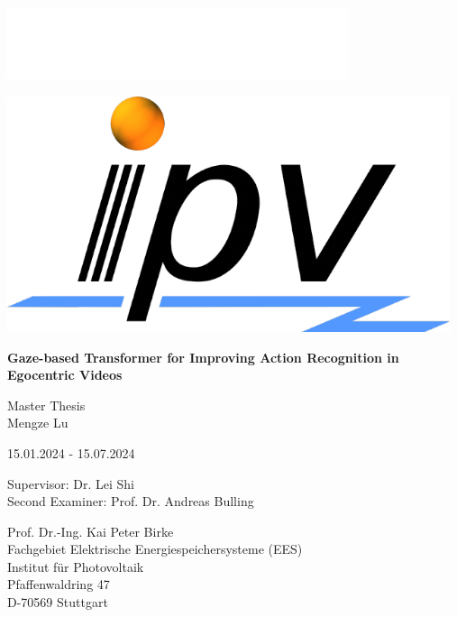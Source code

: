 \thispagestyle{empty}

\enlargethispage{25mm}

\vspace*{-30mm}
\includegraphics[width=100mm]{uni-stuttgart-logo.eps}


\begin{center}
\vspace{10mm}


\includegraphics[width=130mm]{ipv_logo_2011Masterarbeit.pdf}

\vspace{15mm} \Large{\bf Gaze-based Transformer for Improving Action Recognition in Egocentric Videos}  %

\vspace{15mm} \large
Master Thesis\\
Mengze Lu


\vspace{6mm} 15.01.2024 - 15.07.2024 %

\vspace{6mm} Supervisor: Dr. Lei Shi \\
\vspace{3mm} Second Examiner: Prof. Dr. Andreas Bulling

\vspace{6mm}
Prof. Dr.-Ing. Kai Peter Birke\\
Fachgebiet Elektrische Energiespeichersysteme (EES)\\
Institut für Photovoltaik\\

Pfaffenwaldring 47\\
{D-70569 Stuttgart}\\


\end{center}

